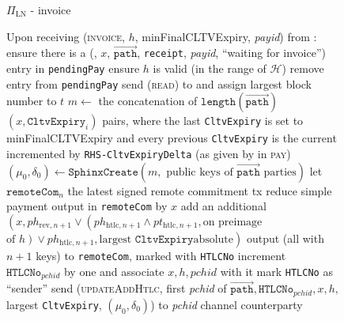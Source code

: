 \begin{figure}[H]
\begin{protocolbox}{$\Pi_{\mathrm{LN}}$ - invoice}
\begin{algorithmic}[1]
        \State Upon receiving (\textsc{invoice}, $h$, minFinalCLTVExpiry,
        \textit{payid}) from \bob:
        \Indent
          \State ensure there is a (\bob, $x$, $\overrightarrow{\mathtt{path}}$,
          \texttt{receipt}, \textit{payid}, ``waiting for invoice'') entry in
          \texttt{pendingPay}
          \State ensure $h$ is valid (in the range of $\mathcal{H}$)
          \State remove entry from \texttt{pendingPay}
          \State send (\textsc{read}) to \ledger{} and assign largest block
          number to $t$
          \State $m \gets$ the concatenation of
          $\mathtt{length}\left(\overrightarrow{\mathtt{path}}\right)$ $\left(x,
          \mathtt{CltvExpiry}_i\right)$ pairs, where the last
          \texttt{CltvExpiry} is set to minFinalCLTVExpiry and every previous
          \texttt{CltvExpiry} is the current incremented by
          \texttt{RHS-CltvExpiryDelta} (as given by \environment{} in
          \textsc{pay})
          \State $\left(\mu_0, \delta_0\right) \gets
          \mathtt{SphinxCreate}\left(m, \text{ public keys of }
          \overrightarrow{\mathtt{path}} \text{ parties}\right)$
          \State let $\mathtt{remoteCom}_n$ the latest signed remote commitment
          tx
          \State reduce simple payment output in \texttt{remoteCom} by $x$
          \State add an additional $\left(x, ph_{\mathrm{rev}, n+1} \vee
          \left(ph_{\mathrm{htlc}, n+1} \wedge pt_{\mathrm{htlc}, n+1}, \text{
          on preimage}\right.\right.$ $\left.\left.\text{of } h\right) \vee
          ph_{\mathrm{htlc}, n+1}, \text{largest } \mathtt{CltvExpiry} \text{
          absolute}\right)$ output (all with $n+1$ keys) to \texttt{remoteCom},
          marked with \texttt{HTLCNo}
          \State increment $\mathtt{HTLCNo}_{\mathit{pchid}}$ by one and
          associate $x, h, \mathit{pchid}$ with it
          \State mark \texttt{HTLCNo} as ``sender''
          \State send (\textsc{updateAddHtlc}, first \textit{pchid} of
          $\overrightarrow{\mathtt{path}}, \mathtt{HTLCNo}_{\mathit{pchid}}, x,
          h,$ largest \texttt{CltvExpiry}, $\left(\mu_0,
          \delta_0\right)$) to \textit{pchid} channel counterparty
        \EndIndent
      \end{algorithmic}
    \end{protocolbox}
    \caption{}
    \label{alg:protocol:pay:invoice}
  \end{figure}

